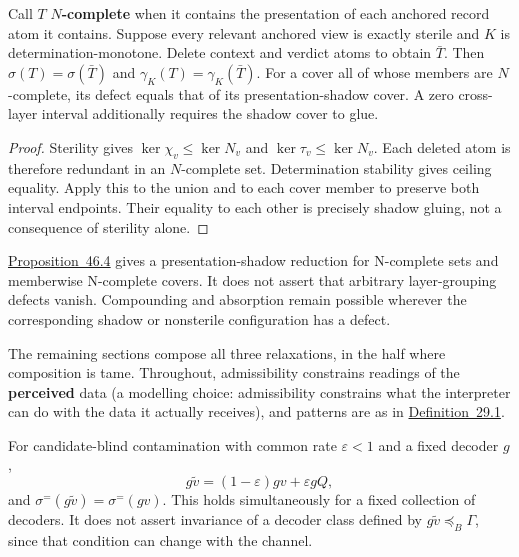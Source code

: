 \begin{thmplain}

Call \(T\) \textbf{\(N\)-complete} when it contains the presentation of each anchored record atom it contains. Suppose every relevant anchored view is exactly sterile and \(K\) is determination-monotone. Delete context and verdict atoms to obtain \(\bar T\). Then \(\sigma(T)=\sigma(\bar T)\) and \(\gamma_K(T)=\gamma_K(\bar T)\). For a cover all of whose members are \(N\)-complete, its defect equals that of its presentation-shadow cover. A zero cross-layer interval additionally requires the shadow cover to glue.
\end{thmplain}

\begin{proof}

Sterility gives \(\ker\chi_v\le\ker N_v\) and \(\ker\tau_v\le\ker N_v\). Each deleted atom is therefore redundant in an \(N\)-complete set. Determination stability gives ceiling equality. Apply this to the union and to each cover member to preserve both interval endpoints. Their equality to each other is precisely shadow gluing, not a consequence of sterility alone.
\end{proof}

\hyperlink{stmt:46.4}{Proposition~46.4} gives a presentation-shadow reduction for N-complete sets and memberwise N-complete covers. It does not assert that arbitrary layer-grouping defects vanish. Compounding and absorption remain possible wherever the corresponding shadow or nonsterile configuration has a defect.


The remaining sections compose all three relaxations, in the half where composition is tame. Throughout, admissibility constrains readings of the \textbf{perceived} data (a modelling choice: admissibility constrains what the interpreter can do with the data it actually receives), and patterns are as in \hyperlink{stmt:29.1}{Definition~29.1}.

\begin{thmplain}

For candidate-blind contamination with common rate \(\varepsilon<1\) and a fixed decoder \(g\),
\[g\widetilde v=(1-\varepsilon)gv+\varepsilon gQ,\]
and \(\sigma^=(g\widetilde v)=\sigma^=(gv)\). This holds simultaneously for a fixed collection of decoders. It does not assert invariance of a decoder class defined by \(g\widetilde v\preceq_B\Gamma\), since that condition can change with the channel.
\end{thmplain}

